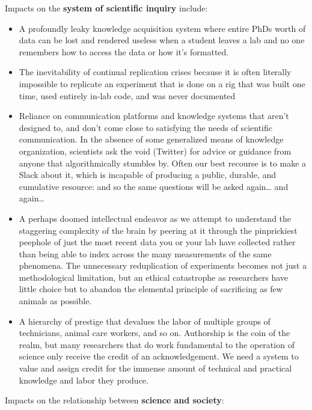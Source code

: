\documentclass[notoc]{tufte-book}
\begin{document}
Impacts on the \textbf{system of scientific inquiry} include:

\begin{itemize}

\item
  A profoundly leaky knowledge acquisition system where entire PhDs
  worth of data can be lost and rendered useless when a student leaves a
  lab and no one remembers how to access the data or how it's formatted.
\item
  The inevitability of continual replication crises because it is often
  literally impossible to replicate an experiment that is done on a rig
  that was built one time, used entirely in-lab code, and was never
  documented
\item
  Reliance on communication platforms and knowledge systems that aren't
  designed to, and don't come close to satisfying the needs of
  scientific communication. In the absence of some generalized means of
  knowledge organization, scientists ask the void (Twitter) for advice
  or guidance from anyone that algorithmically stumbles by. Often our
  best recourse is to make a Slack about it, which is incapable of
  producing a public, durable, and cumulative resource: and so the same
  questions will be asked again\ldots{} and again\ldots{}
\item
  A perhaps doomed intellectual endeavor as we attempt to understand the staggering
  complexity of the brain by peering at it through the pinprickiest
  peephole of just the most recent data you or your lab have collected
  rather than being able to index across the many measurements of the
  same phenomena. The unnecessary reduplication of experiments becomes
  not just a methodological limitation, but an ethical catastrophe as
  researchers have little choice but to abandon the elemental principle
  of sacrificing as few animals as possible.
\item
  A hierarchy of prestige that devalues the labor of multiple groups of
  technicians, animal care workers, and so on. Authorship is the coin of
  the realm, but many researchers that do work fundamental to the
  operation of science only receive the credit of an acknowledgement. We
  need a system to value and assign credit for the immense amount of
  technical and practical knowledge and labor they produce.
\end{itemize}

Impacts on the relationship between \textbf{science and society}:
\end{document}

